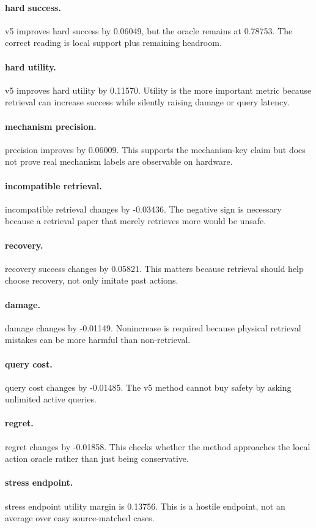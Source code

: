 \documentclass{article}
\begin{document}
\paragraph{hard success.} v5 improves hard success by 0.06049, but the oracle remains at 0.78753. The correct reading is local support plus remaining headroom.
\paragraph{hard utility.} v5 improves hard utility by 0.11570. Utility is the more important metric because retrieval can increase success while silently raising damage or query latency.
\paragraph{mechanism precision.} precision improves by 0.06009. This supports the mechanism-key claim but does not prove real mechanism labels are observable on hardware.
\paragraph{incompatible retrieval.} incompatible retrieval changes by -0.03436. The negative sign is necessary because a retrieval paper that merely retrieves more would be unsafe.
\paragraph{recovery.} recovery success changes by 0.05821. This matters because retrieval should help choose recovery, not only imitate past actions.
\paragraph{damage.} damage changes by -0.01149. Nonincrease is required because physical retrieval mistakes can be more harmful than non-retrieval.
\paragraph{query cost.} query cost changes by -0.01485. The v5 method cannot buy safety by asking unlimited active queries.
\paragraph{regret.} regret changes by -0.01858. This checks whether the method approaches the local action oracle rather than just being conservative.
\paragraph{stress endpoint.} stress endpoint utility margin is 0.13756. This is a hostile endpoint, not an average over easy source-matched cases.
\end{document}
